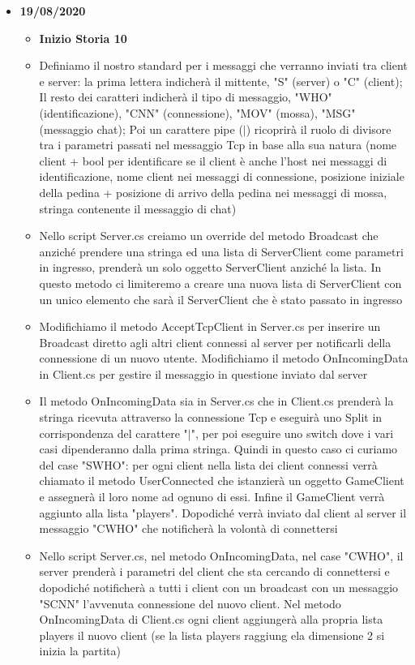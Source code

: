 \documentclass[12pt]{article}
\begin{document}
\begin{itemize}
\begin{itemize}
	\end{itemize}
\item \textbf{19/08/2020}
	\begin{itemize}
	\item \textbf{Inizio Storia 10}
	\item Definiamo il nostro standard per i messaggi che verranno inviati tra client e server: la prima lettera indicherà il mittente, "S" (server) o "C" (client);
Il resto dei caratteri indicherà il tipo di messaggio, "WHO" (identificazione), "CNN" (connessione), "MOV" (mossa), "MSG" (messaggio chat);
Poi un carattere pipe ($|$) ricoprirà il ruolo di divisore tra i parametri passati nel messaggio Tcp in base alla sua natura (nome client + bool per identificare se il client è anche l'host nei messaggi di identificazione, nome client nei messaggi di connessione, posizione iniziale della pedina + posizione di arrivo della pedina nei messaggi di mossa, stringa contenente il messaggio di chat)
	\item Nello script Server.cs creiamo un override del metodo Broadcast che anziché prendere una stringa ed una lista di ServerClient come parametri in ingresso, prenderà un solo oggetto ServerClient anziché la lista. In questo metodo ci limiteremo a creare una nuova lista di ServerClient con un unico elemento che sarà il ServerClient che è stato passato in ingresso
	\item Modifichiamo il metodo AcceptTcpClient in Server.cs per inserire un Broadcast diretto agli altri client connessi al server per notificarli della connessione di un nuovo utente. Modifichiamo il metodo OnIncomingData in Client.cs per gestire il messaggio in questione inviato dal server
	\item Il metodo OnIncomingData sia in Server.cs che in Client.cs prenderà la stringa ricevuta attraverso la connessione Tcp e eseguirà uno Split in corrispondenza del carattere "$|$", per poi eseguire uno switch dove i vari casi dipenderanno dalla prima stringa. Quindi in questo caso ci curiamo del case "SWHO": per ogni client nella lista dei client connessi verrà chiamato il metodo UserConnected che istanzierà un oggetto GameClient e assegnerà il loro nome ad ognuno di essi. Infine il GameClient verrà aggiunto alla lista "players". Dopodiché verrà inviato dal client al server il messaggio "CWHO" che notificherà la volontà di connettersi
	\item Nello script Server.cs, nel metodo OnIncomingData, nel case "CWHO", il server prenderà i parametri del client che sta cercando di connettersi e dopodiché notificherà a tutti i client con un broadcast con un messaggio "SCNN" l'avvenuta connessione del nuovo client. Nel metodo OnIncomingData di Client.cs ogni client aggiungerà alla propria lista players il nuovo client (se la lista players raggiung ela dimensione 2 si inizia la partita)

\end{itemize}
\end{itemize}
\end{document}
